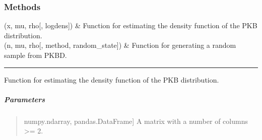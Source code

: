 \documentclass[letterpaper,10pt,english,openany,oneside]{sphinxmanual}
\begin{document}
{{{{\begin{fulllineitems}
\end{fulllineitems}

\subsubsection*{Methods}


\begin{savenotes}\sphinxattablestart
\sphinxthistablewithglobalstyle
\sphinxthistablewithnovlinesstyle
\centering
\begin{tabulary}{\linewidth}[t]{}
\sphinxtoprule
\sphinxtableatstartofbodyhook
\sphinxAtStartPar
{\hyperref[\detokenize{api_reference/generated/QuadratiK.spherical_clustering.PKBD:QuadratiK.spherical_clustering.PKBD.dpkb}]{}}(x, mu, rho{[}, logdens{]})
&
\sphinxAtStartPar
Function for estimating the density function of the PKB distribution.
\\
\sphinxhline
\sphinxAtStartPar
{\hyperref[\detokenize{api_reference/generated/QuadratiK.spherical_clustering.PKBD:QuadratiK.spherical_clustering.PKBD.rpkb}]{}}(n, mu, rho{[}, method, random\_state{]})
&
\sphinxAtStartPar
Function for generating a random sample from PKBD.
\\
\sphinxbottomrule
\end{tabulary}
\sphinxtableafterendhook\par
\sphinxattableend\end{savenotes}


\bigskip\hrule\bigskip


\begin{fulllineitems}
\label{\detokenize{api_reference/generated/QuadratiK.spherical_clustering.PKBD:QuadratiK.spherical_clustering.PKBD.dpkb}}
\pysigstartsignatures
{}
\pysigstopsignatures
\sphinxAtStartPar
Function for estimating the density function of the PKB distribution.


\subparagraph{Parameters}
\label{\detokenize{api_reference/generated/QuadratiK.spherical_clustering.PKBD:parameters}}\begin{quote}
\begin{description}
\sphinxlineitem{x}{[}numpy.ndarray, pandas.DataFrame{]}
\sphinxAtStartPar
A matrix with a number of columns \textgreater{}= 2.


\end{description}
\end{quote}
\end{fulllineitems}}}}}
\end{document}
